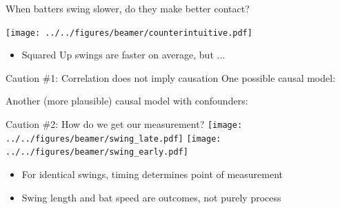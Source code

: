 \documentclass{beamer}
\begin{document}
\begin{frame}{When batters swing slower, do they make better contact?}
  \begin{center}
    \texttt{[image: ../../figures/beamer/counterintuitive.pdf]}
  \end{center}
  \begin{itemize}
    \item Squared Up swings are faster on average, but ...
  \end{itemize}
\end{frame}

\begin{frame}{Caution \#1: Correlation does not imply causation}
  One possible causal model:
  \begin{center}
  \end{center}
  Another (more plausible) causal model with confounders:
  \begin{center}
  \end{center}
\end{frame}

\begin{frame}{Caution \#2: How do we get our measurement?}
  \texttt{[image: ../../figures/beamer/swing\_late.pdf]}
  \texttt{[image: ../../figures/beamer/swing\_early.pdf]}
  \begin{itemize}
    \item For \alert{identical} swings, timing determines point of measurement
    \item Swing length and bat speed are \alert{outcomes}, not purely process
  \end{itemize}
\end{frame}
\end{document}
